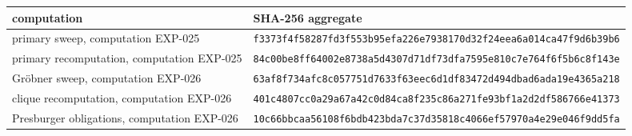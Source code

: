 \begin{tabular}{@{}ll@{}}
\toprule
computation & SHA-256 aggregate\\
\midrule
primary sweep, computation EXP-025 & \texttt{\scriptsize f3373f4f58287fd3f553b95efa226e7938170d32f24eea6a014ca47f9d6b39b6}\\
primary recomputation, computation EXP-025 & \texttt{\scriptsize 84c00be8ff64002e8738a5d4307d71df73dfa7595e810c7e764f6f5b6c8f143e}\\
Gr\"obner sweep, computation EXP-026 & \texttt{\scriptsize 63af8f734afc8c057751d7633f63eec6d1df83472d494dbad6ada19e4365a218}\\
clique recomputation, computation EXP-026 & \texttt{\scriptsize 401c4807cc0a29a67a42c0d84ca8f235c86a271fe93bf1a2d2df586766e41373}\\
Presburger obligations, computation EXP-026 & \texttt{\scriptsize 10c66bbcaa56108f6bdb423bda7c37d35818c4066ef57970a4e29e046f9dd5fa}\\
\bottomrule
\end{tabular}
